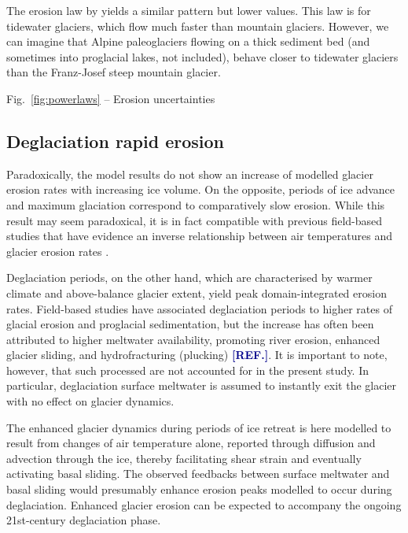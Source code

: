 \documentclass[utf8]{article}
\newcommand{\aref}[0]{\textcolor{darkblue}{\textbf{[REF.]}}}
\begin{document}
    The erosion law by \citet{Koppes.etal.2015} yields a similar pattern but
    lower values. This law is for tidewater glaciers, which flow much faster
    than mountain glaciers. However, we can imagine that Alpine paleoglaciers
    flowing on a thick sediment bed (and sometimes into proglacial lakes, not
    included), behave closer to tidewater glaciers than the Franz-Josef steep
    mountain glacier.

    Fig.~\ref{fig:powerlaws} -- Erosion uncertainties

\subsection{Deglaciation rapid erosion}

    Paradoxically, the model results do not show an increase of modelled
    glacier erosion rates with increasing ice volume.  On the opposite, periods
    of ice advance and maximum glaciation correspond to comparatively slow
    erosion. While this result may seem paradoxical, it is in fact
    compatible with previous field-based studies that have evidence an inverse
    relationship between air temperatures and glacier erosion rates
    \citep{Koppes.etal.2015, Cook.etal.2020}.

    Deglaciation periods, on the other hand, which are characterised by warmer
    climate and above-balance glacier extent, yield peak domain-integrated
    erosion rates. Field-based studies have associated deglaciation periods to
    higher rates of glacial erosion and proglacial sedimentation, but the increase
    has often been attributed to higher meltwater availability, promoting river
    erosion, enhanced glacier sliding, and hydrofracturing (plucking) \aref. It
    is important to note, however, that such processed are not accounted for in
    the present study. In particular, deglaciation surface meltwater is assumed
    to instantly exit the glacier with no effect on glacier dynamics.

    The enhanced glacier dynamics during periods of ice retreat is here
    modelled to result from changes of air temperature alone, reported through
    diffusion and advection through the ice, thereby facilitating shear strain
    and eventually activating basal sliding. The observed feedbacks between
    surface meltwater and basal sliding would presumably enhance erosion peaks
    modelled to occur during deglaciation. Enhanced glacier erosion can be
    expected to accompany the ongoing 21st-century deglaciation phase.
\end{document}
